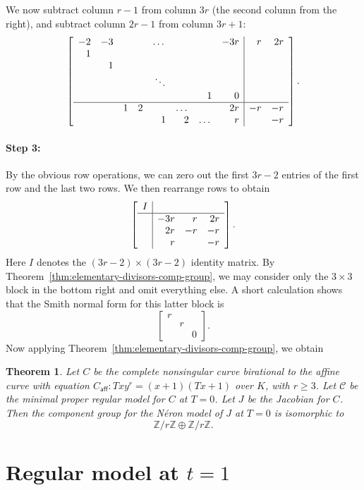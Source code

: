 \documentclass[reqno]{amsart}
\newtheorem{thm}{Theorem}[section]
\theoremstyle{definition}
\theoremstyle{remark}
\def\Z{\mathbb{Z}}
\def\scd{\mathscr{C}}
\def\caff{C_{\textsf{aff}}}
\begin{document}
We now subtract column $r-1$ from column $3r$ (the second column from the right), and subtract column $2r-1$ from column $3r+1$:
\[
\left[\begin{array}{rrrrrrrr|rr}
  -2 & -3 & & & \dots & & & -3r & r & 2r \\
  1 & & & & & & & & & \\
  & 1 & & & & & & & & \\
  & & & & \ddots & & & & & \\
  & & & & & & 1 & 0 & & \\ \hline
  & & 1 & 2 & & \dots & & 2r & -r & -r \\
  & & & & 1 & 2 & \dots & r & & -r
\end{array}\right].
\]

\paragraph{Step 3:}
\label{sec:step-3}

By the obvious row operations, we can zero out the first $3r-2$ entries of the first row and the last two rows. We then rearrange rows to obtain
\[
\left[\begin{array}{c|rrr}
  I & & & \\ \hline
  & -3r & r & 2r \\
  & 2r & -r & -r \\
  & r & & -r
\end{array}\right].
\]
Here $I$ denotes the $(3r-2) \times (3r-2)$ identity matrix. By Theorem~\ref{thm:elementary-divisors-comp-group}, we may consider only the $3 \times 3$ block in the bottom right and omit everything else. A short calculation shows that the Smith normal form for this latter block is
\[
\begin{bmatrix}
  r & & \\
  & r & \\
  & & 0
\end{bmatrix}.
\]
Now applying Theorem~\ref{thm:elementary-divisors-comp-group}, we obtain
\begin{thm}
  Let $C$ be the complete nonsingular curve birational to the affine curve with equation $\caff:Txy^r = (x+1)(Tx+1)$ over $K$, with $r \geq 3$. Let $\scd$ be the minimal proper regular model for $C$ at $T = 0$. Let $J$ be the Jacobian for $C$. Then the component group for the N\'eron model of $J$ at $T = 0$ is isomorphic to
  \[
  {\Z}/{r\Z} \oplus {\Z}/{r\Z}.
  \]
\end{thm}


\section{Regular model at $t=1$}
\label{sec:regular-model-at-t-equals-one}
\end{document}
